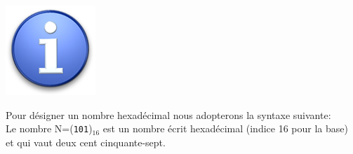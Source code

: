 \documentclass{article}
\begin{document}
\begin{enumerate}
\vspace{2em}
\begin{minipage}[b]{.08\linewidth}
	\includegraphics[width=\linewidth]{./figures/info.png}
\end{minipage}
\hfill
\begin{minipage}[b]{.85\linewidth}
Pour désigner un nombre hexadécimal nous adopterons la syntaxe suivante:\\

Le nombre N=(\texttt{101})$_{16}$ est un nombre écrit hexadécimal (indice 16 pour la base) et qui vaut deux cent cinquante-sept.
\end{minipage}


\end{enumerate}
\end{document}
